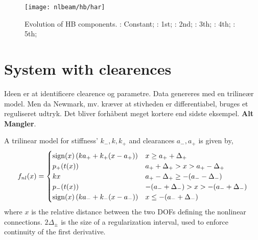 \begin{figure}[!ht]
  \centering
  \texttt{[image: nlbeam/hb/har]}
  \caption{Evolution of HB components.
    \textcolor{blue}{\sampleline{}}: Constant;
    \sampleline{}: 1st;
    \textcolor{orange}{}: 2nd;
    \textcolor{green}{}: 3th;
    \textcolor{red}{\sampleline{}}: 4th;
    \textcolor{purple}{}: 5th;
  }
  \label{fig:nlbeam_hb_components}
\end{figure}


\FloatBarrier
\section{System with clearences}
\label{sec:syst-with-clear}

Ideen er at identificere clearence og parametre. Data genereres med en trilineær
model. Men da Newmark, mv. kræver at stivheden er differentiabel, bruges et
reguliseret udtryk. Det bliver forhåbent meget kortere end sidste eksempel. \textbf{Alt Mangler}.

A trilinear model for stiffness' $k_-, k, k_+$ and clearances $a_-, a_+$ is
given by, %
\begin{equation}
  \label{eq:fnl_piecewise}
  f_{nl}(x) =
  \begin{cases}
    \operatorname{sign}(x) \left( ka_+ + k_+(x-a_+) \right) & x \geq a_+ + \Delta_+ \\
    p_+(t(x)) & a_+ + \Delta_+ > x > a_+ - \Delta_+ \\
    kx & a_+ - \Delta_+ \geq -(a_- - \Delta_-) \\
    p_-(t(x)) & -(a_- + \Delta_-) > x > -(a_- + \Delta_-) \\
    \operatorname{sign}(x) \left( ka_- + k_-(x-a_-) \right) & x \leq -(a_- + \Delta_-) \\
  \end{cases}
\end{equation}
where $x$ is the relative distance between the two DOFs defining the nonlinear
connections. $2\Delta_\pm$ is the size of a regularization interval, used to
enforce continuity of the first derivative.

